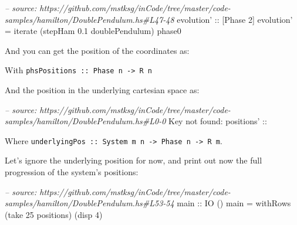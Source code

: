 \documentclass[]{article}
\newenvironment{Shaded}{}{}
\newcommand{\DataTypeTok}[1]{\textcolor[rgb]{0.56,0.13,0.00}{{#1}}}
\newcommand{\DecValTok}[1]{\textcolor[rgb]{0.25,0.63,0.44}{{#1}}}
\newcommand{\FloatTok}[1]{\textcolor[rgb]{0.25,0.63,0.44}{{#1}}}
\newcommand{\CommentTok}[1]{\textcolor[rgb]{0.38,0.63,0.69}{\textit{{#1}}}}
\newcommand{\OtherTok}[1]{\textcolor[rgb]{0.00,0.44,0.13}{{#1}}}
\newcommand{\FunctionTok}[1]{\textcolor[rgb]{0.02,0.16,0.49}{{#1}}}
\newcommand{\NormalTok}[1]{{#1}}
\begin{document}
\begin{Shaded}
\begin{Highlighting}[]
\CommentTok{-- source: https://github.com/mstksg/inCode/tree/master/code-samples/hamilton/DoublePendulum.hs#L47-48}
\OtherTok{evolution' ::} \NormalTok{[}\DataTypeTok{Phase} \DecValTok{2}\NormalTok{]}
\NormalTok{evolution' }\FunctionTok{=} \NormalTok{iterate (stepHam }\FloatTok{0.1} \NormalTok{doublePendulum) phase0}
\end{Highlighting}
\end{Shaded}

And you can get the position of the coordinates as:

\begin{Shaded}
\end{Shaded}

With \texttt{phsPositions\ ::\ Phase\ n\ -\textgreater{}\ R\ n}

And the position in the underlying cartesian space as:

\begin{Shaded}
\begin{Highlighting}[]
\CommentTok{-- source: https://github.com/mstksg/inCode/tree/master/code-samples/hamilton/DoublePendulum.hs#L0-0}
\DataTypeTok{Key} \NormalTok{not found}\FunctionTok{:}\OtherTok{ positions' ::}
\end{Highlighting}
\end{Shaded}

Where
\texttt{underlyingPos\ ::\ System\ m\ n\ -\textgreater{}\ Phase\ n\ -\textgreater{}\ R\ m}.

Let's ignore the underlying position for now, and print out now the full
progression of the system's positions:

\begin{Shaded}
\begin{Highlighting}[]
\CommentTok{-- source: https://github.com/mstksg/inCode/tree/master/code-samples/hamilton/DoublePendulum.hs#L53-54}
\OtherTok{main ::} \DataTypeTok{IO} \NormalTok{()}
\NormalTok{main }\FunctionTok{=} \NormalTok{withRows (take }\DecValTok{25} \NormalTok{positions) (disp }\DecValTok{4}\NormalTok{)}
\end{Highlighting}
\end{Shaded}
\end{document}
